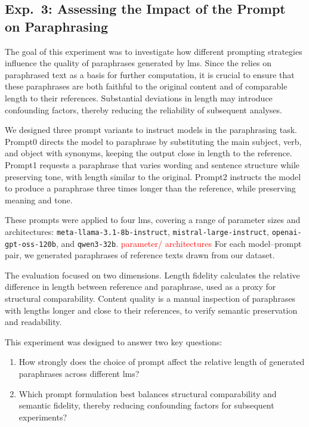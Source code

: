 \subsection{Exp.\ 3: Assessing the Impact of the Prompt on Paraphrasing}
\label{subsec:prompt_impact}

The goal of this experiment was to investigate how different prompting strategies influence the quality of paraphrases generated by \acp{lm}.  
Since the \impAppr{} relies on paraphrased text as a basis for further computation, it is crucial to ensure that these paraphrases are both faithful to the original content and of comparable length to their references.  
Substantial deviations in length may introduce confounding factors, thereby reducing the reliability of subsequent analyses.  

We designed three prompt variants to instruct models in the paraphrasing task.
Prompt0 directs the model to paraphrase by substituting the main subject, verb, and object with synonyms, keeping the output close in length to the reference.  
Prompt1 requests a paraphrase that varies wording and sentence structure while preserving tone, with length similar to the original.  
Prompt2 instructs the model to produce a paraphrase three times longer than the reference, while preserving meaning and tone. 

These prompts were applied to four \acp{lm}, covering a range of parameter sizes and architectures: \texttt{meta-llama-3.1-8b-instruct}, \texttt{mistral-large-instruct}, \texttt{openai-gpt-oss-120b}, and \texttt{qwen3-32b}.  
\textcolor{red}{parameter/ architectures}
For each model–prompt pair, we generated paraphrases of reference texts drawn from our dataset.  


The evaluation focused on two dimensions.
Length fidelity calculates the relative difference in length between reference and paraphrase, used as a proxy for structural comparability.  
Content quality is a manual inspection of paraphrases with lengths longer and close to their references, to verify semantic preservation and readability.  

This experiment was designed to answer two key questions:  
\begin{enumerate}
    \item How strongly does the choice of prompt affect the relative length of generated paraphrases across different \acp{lm}?  
    \item Which prompt formulation best balances structural comparability and semantic fidelity, thereby reducing confounding factors for subsequent \imp{} experiments?  
\end{enumerate}
